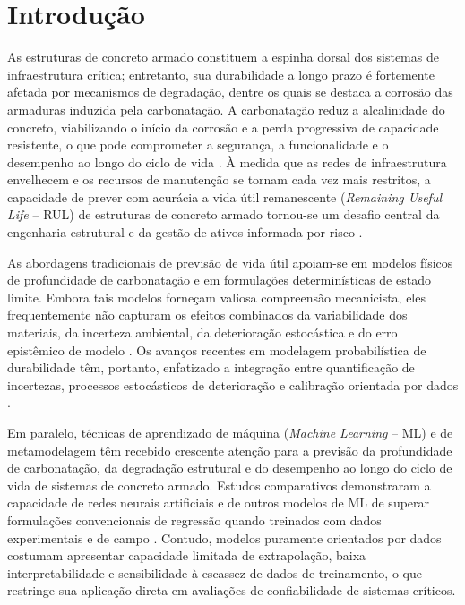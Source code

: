 \section{Introdu\c{c}\~ao}\label{sec:intro}


As estruturas de concreto armado constituem a espinha dorsal dos sistemas de infraestrutura crítica; entretanto, sua durabilidade a longo prazo é fortemente afetada por mecanismos de degradação, dentre os quais se destaca a corrosão das armaduras induzida pela carbonatação. A carbonatação reduz a alcalinidade do concreto, viabilizando o início da corrosão e a perda progressiva de capacidade resistente, o que pode comprometer a segurança, a funcionalidade e o desempenho ao longo do ciclo de vida \parencite{tuutti1982, possan2010}. À medida que as redes de infraestrutura envelhecem e os recursos de manutenção se tornam cada vez mais restritos, a capacidade de prever com acurácia a vida útil remanescente (\textit{Remaining Useful Life} -- RUL) de estruturas de concreto armado tornou-se um desafio central da engenharia estrutural e da gestão de ativos informada por risco \parencite{ellingwood2005, frangopol2011, si2011}.

As abordagens tradicionais de previsão de vida útil apoiam-se em modelos físicos de profundidade de carbonatação e em formulações determinísticas de estado limite. Embora tais modelos forneçam valiosa compreensão mecanicista, eles frequentemente não capturam os efeitos combinados da variabilidade dos materiais, da incerteza ambiental, da deterioração estocástica e do erro epistêmico de modelo \parencite{possan2010, melchers2018}. Os avanços recentes em modelagem probabilística de durabilidade têm, portanto, enfatizado a integração entre quantificação de incertezas, processos estocásticos de deterioração e calibração orientada por dados \parencite{jcss2001, fib2006}.

Em paralelo, técnicas de aprendizado de máquina (\textit{Machine Learning} -- ML) e de metamodelagem têm recebido crescente atenção para a previsão da profundidade de carbonatação, da degradação estrutural e do desempenho ao longo do ciclo de vida de sistemas de concreto armado. Estudos comparativos demonstraram a capacidade de redes neurais artificiais e de outros modelos de ML de superar formulações convencionais de regressão quando treinados com dados experimentais e de campo \parencite{couto2025}. Contudo, modelos puramente orientados por dados costumam apresentar capacidade limitada de extrapolação, baixa interpretabilidade e sensibilidade à escassez de dados de treinamento, o que restringe sua aplicação direta em avaliações de confiabilidade de sistemas críticos.

